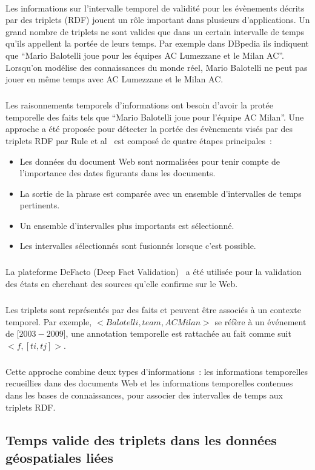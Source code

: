 \paragraph{}
Les informations sur l'intervalle temporel de validité pour les évènements décrits par des triplets (RDF) jouent un rôle important dans plusieurs d'applications.
Un grand nombre de triplets ne sont valides que dans un certain intervalle de temps qu'ils appellent la portée de leurs temps.
Par exemple dans DBpedia ils indiquent que ``Mario Balotelli joue pour les équipes AC Lumezzane et le Milan AC''. Lorsqu'on modélise des connaissances du monde réel, Mario Balotelli ne peut pas jouer en même temps avec AC Lumezzane et le Milan AC.
\subparagraph{}
Les raisonnements temporels d'informations ont besoin d'avoir la protée temporelle des faits tels que ``Mario Balotelli joue pour l'équipe AC Milan''.
Une approche a été proposée pour détecter la portée des évènements visés par des triplets RDF par Rule et al~\cite{rula2014} est composé de quatre étapes principales~:
\begin{itemize}
\item Les données du document Web sont normalisées pour tenir compte de l’importance des dates figurants dans les documents.
\item La sortie de la phrase est comparée avec un ensemble d’intervalles de temps pertinents.
\item Un ensemble d’intervalles plus importants est sélectionné.
\item Les intervalles sélectionnés sont fusionnés lorsque c’est possible.
\end{itemize}
\subparagraph{}
La plateforme DeFacto (Deep Fact Validation)~\cite{lehmann2012} a été utilisée pour la validation des états en cherchant des sources qu'elle confirme sur le Web.
\subparagraph{}
Les triplets sont représentés par des faits et peuvent être associés à un contexte temporel.
Par exemple, $<Balotelli, team, AC Milan>$ se réfère à un événement de [$2003-2009$], une annotation temporelle est rattachée au fait comme suit $<f, [ti,tj]>$.
\subparagraph{}
Cette approche combine deux types d'informations~: les informations temporelles recueillies dans des documents Web et les informations temporelles contenues dans les bases de connaissances, pour associer des intervalles de temps aux triplets RDF.
\subsection{Temps valide des triplets dans les données géospatiales liées}
